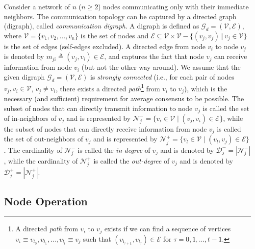 \documentclass[twocolumn]{autart}    %
\begin{document}
Consider a network of $n$ ($n \geq 2$) nodes communicating only with their immediate neighbors. 
The communication topology can be captured by a directed graph (digraph), called \textit{communication digraph}. 
A digraph is defined as $\mathcal{G}_d = (\mathcal{V}, \mathcal{E})$, where $\mathcal{V} =  \{v_1, v_2, \dots, v_n\}$ is the set of nodes and $\mathcal{E} \subseteq \mathcal{V} \times \mathcal{V} - \{ (v_j, v_j) \ | \ v_j \in \mathcal{V} \}$ is the set of edges (self-edges excluded). 
A directed edge from node $v_i$ to node $v_j$ is denoted by $m_{ji} \triangleq (v_j, v_i) \in \mathcal{E}$, and captures the fact that node $v_j$ can receive information from node $v_i$ (but not the other way around). 
We assume that the given digraph $\mathcal{G}_d = (\mathcal{V}, \mathcal{E})$ is \textit{strongly connected} (i.e., for each pair of nodes $v_j, v_i \in \mathcal{V}$, $v_j \neq v_i$, there exists a directed \textit{path}\footnote{A directed \textit{path} from $v_i$ to $v_j$ exists if we can find a sequence of vertices $v_i \equiv v_{l_0},v_{l_1}, \dots, v_{l_t} \equiv v_j$ such that $(v_{l_{\tau+1}},v_{l_{\tau}}) \in \mathcal{E}$ for $ \tau = 0, 1, \dots , t-1$.} from $v_i$ to $v_j$), which is the necessary (and sufficient) requirement for average consensus to be possible. 
The subset of nodes that can directly transmit information to node $v_j$ is called the set of in-neighbors of $v_j$ and is represented by $\mathcal{N}_j^- = \{ v_i \in \mathcal{V} \; | \; (v_j,v_i)\in \mathcal{E}\}$, while the subset of nodes that can directly receive information from node $v_j$ is called the set of out-neighbors of $v_j$ and is represented by $\mathcal{N}_j^+ = \{ v_l \in \mathcal{V} \; | \; (v_l,v_j)\in \mathcal{E}\}$. 
The cardinality of $\mathcal{N}_j^-$ is called the \textit{in-degree} of $v_j$ and is denoted by $\mathcal{D}_j^- = | \mathcal{N}_j^- |$, while the cardinality of $\mathcal{N}_j^+$ is called the \textit{out-degree} of $v_j$ and is denoted by $\mathcal{D}_j^+ = | \mathcal{N}_j^+ |$. 


\subsection{Node Operation}
\end{document}
